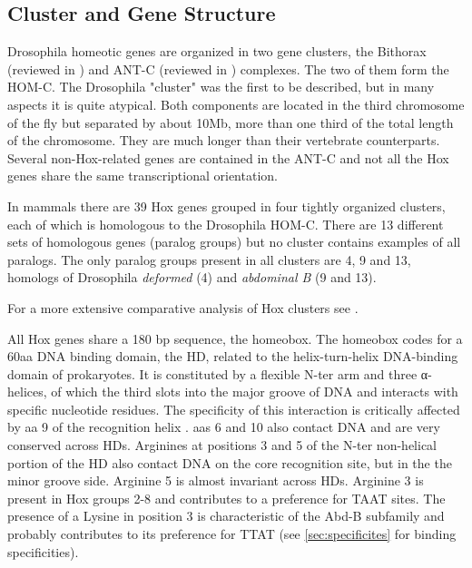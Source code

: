 



\subsection{Cluster and Gene Structure}

Drosophila homeotic genes are organized in two gene clusters, the  Bithorax (reviewed in \cite{Lewis1978}) and \ac{ANT-C} (reviewed in \cite{Kaufman1990}) complexes. The two of them form the \ac{HOM-C}. The Drosophila "cluster" was the first to be described, but in many aspects it is quite atypical. Both components are located in the third chromosome of the fly but separated by about 10Mb, more than one third of the total length of the chromosome. They are much longer than their vertebrate counterparts. Several non-Hox-related genes are contained in the \ac{ANT-C} and not all the Hox genes share the same transcriptional orientation. 

In mammals there are 39 Hox genes grouped in four tightly organized clusters, each of which is homologous to the Drosophila \ac{HOM-C}. There are 13 different sets of homologous genes (paralog groups) but no cluster contains examples of all paralogs. The only paralog groups present in all clusters are 4, 9 and 13, homologs of Drosophila \textit{deformed} (4) and \textit{abdominal B} (9 and 13). 


For a more extensive comparative analysis of Hox clusters see \textcite{Duboule2007}.

All Hox genes share a 180 bp sequence, the homeobox. The homeobox codes for a 60aa DNA binding domain, the \ac{HD}, related to the helix-turn-helix DNA-binding domain of prokaryotes. It is constituted by a flexible \ac{N-ter} arm and three α-helices, of which the third slots into the major groove of DNA and interacts with specific nucleotide residues. The specificity of this interaction is critically affected by \ac{aa} 9 of the recognition helix \parencite{Treisman1992}. \acp{aa} 6 and 10 also contact DNA and are very conserved across \acp{HD}. Arginines at positions 3 and 5 of the \ac{N-ter} non-helical portion of the \ac{HD} also contact DNA on the core recognition site, but in the the minor groove side. Arginine 5 is almost invariant across \acp{HD}. Arginine 3 is present in Hox groups 2-8 and contributes to a preference for TAAT sites. The presence of a Lysine in position 3 is characteristic of the \ac{Abd-B} subfamily and probably contributes to its preference for TTAT (see \ref{sec:specificites} for binding specificities).

